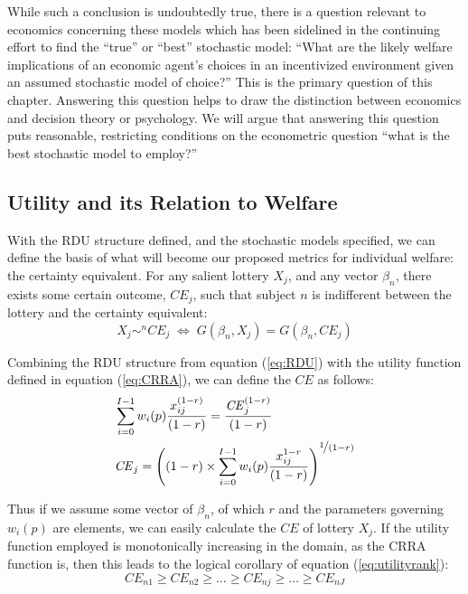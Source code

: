 \documentclass[11pt,a4paper]{article}
\newcommand\CE{\ensuremath{\mathit{CE}}}  %
\begin{document}
While such a conclusion is undoubtedly true, there is a question relevant to economics concerning these models which has been sidelined in the continuing effort to find the \enquote{true} or \enquote{best} stochastic model: \enquote{What are the likely welfare implications of an economic agent's choices in an incentivized environment given an assumed stochastic model of choice?} This is the primary question of this chapter.
Answering this question helps to draw the distinction between economics and decision theory or psychology.
We will argue that answering this question puts reasonable, restricting conditions on the econometric question \enquote{what is the best stochastic model to employ?}

\subsection{Utility and its Relation to Welfare}

With the RDU structure defined, and the stochastic models specified, we can define the basis of what will become our proposed metrics for individual welfare: the certainty equivalent.
For any salient lottery $X_j$, and any vector $\beta_n$, there exists some certain outcome, $\CE_j$, such that subject $n$ is indifferent between the lottery and the certainty equivalent:
\begin{equation}
	\label{eq:CE.indiff}
	X_j \sim^n {\CE}_j \;\Leftrightarrow\; G(\beta_n,X_j) = G(\beta_n, {\CE}_j)
\end{equation}

Combining the RDU structure from equation (\ref{eq:RDU}) with the utility function defined in equation (\ref{eq:CRRA}), we can define the {\CE} as follows:
\begin{align}
	\label{eq:CEcalc}
	\begin{split}
		&\sum_{i=0}^{I-1} w_i(p) \frac{x_{ij}^{(1-r)}}{(1-r)} = \frac{ {\CE}_j^{(1-r)}}{(1-r)}\\
		&{\CE}_j =  \left( (1-r) \times \sum_{i=0}^{I-1} w_i(p) \frac{x_{ij}^{1-r}}{(1-r)} \right)^{ \displaystyle\nicefrac{1}{(1-r)} }
	\end{split}
\end{align}

Thus if we assume some vector of $\beta_n$, of which $r$ and the parameters governing $w_i(p)$ are elements, we can easily calculate the {\CE} of lottery $X_j$.{\footnotemark}
If the utility function employed is monotonically increasing in the domain, as the CRRA function is, then this leads to the  logical corollary of equation (\ref{eq:utilityrank}):
\begin{equation}
	\label{eq:CErank}
	{\CE}_{n1} \geq {\CE}_{n2} \geq \ldots \geq {\CE}_{nj} \geq \ldots \geq {\CE}_{nJ}
\end{equation}
\end{document}
